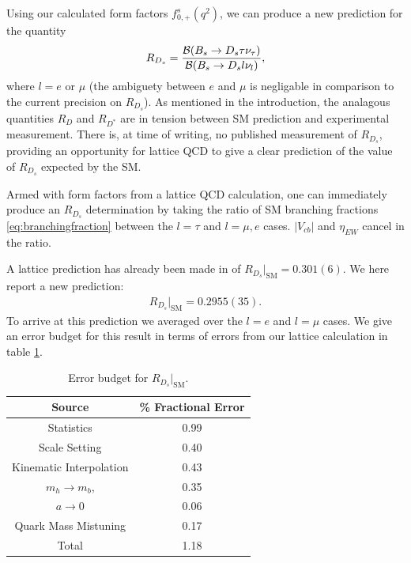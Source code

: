 Using our calculated form factors $f^s_{0,+}(q^2)$, we can produce a new prediction for the quantity
\begin{align}
  R_{D_s} = {\mathcal{B}(B_s\to D_s \tau \nu_{\tau})\over
    \mathcal{B}(B_s\to D_s l \nu_{l})},
\end{align}
where $l=e$ or $\mu$ (the ambiguety between $e$ and $\mu$ is negligable in comparison to the current precision on $R_{D_s}$). As mentioned in the introduction, the analagous quantities $R_{D}$ and $R_{D^*}$ are in tension between SM prediction and experimental measurement. There is, at time of writing, no published measurement of $R_{D_s}$, providing an opportunity for lattice QCD to give a clear prediction of the value of $R_{D_s}$ expected by the SM.

Armed with form factors from a lattice QCD calculation, one can immediately produce an $R_{D_s}$ determination by taking the ratio of SM branching fractions \eqref{eq:branchingfraction} between the $l=\tau$ and $l=\mu,e$ cases. $|V_{cb}|$ and $\eta_{EW}$ cancel in the ratio.

A lattice prediction has already been made in \cite{Monahan:2017uby} of $R_{D_s}|_{\text{SM}} = 0.301(6)$. We here report a new prediction:
\begin{align}
  R_{D_s}|_{\text{SM}} = 0.2955(35).
  \label{eq:RDs}
\end{align}
To arrive at this prediction we averaged over the $l=e$ and $l=\mu$ cases. We give an error budget for this result in terms of errors from our lattice calculation in table \ref{RDs_budget}.

\begin{table}[htb!]
  \begin{center}
    \begin{tabular}{c c}
      \hline
      Source & \% Fractional Error \\ [0.5ex]
      \hline
      Statistics & 0.99  \\ [1ex]
      Scale Setting & 0.40  \\ [1ex]
      Kinematic Interpolation & 0.43  \\ [1ex]
      $m_h \to m_b$, & 0.35  \\ [1ex]
      $a\to 0$ & 0.06  \\ [1ex]
      Quark Mass Mistuning & 0.17 \\ [1ex]
      \hline
      Total & 1.18 \\ [1ex]
      \hline
    \end{tabular}
  \end{center}
  \caption{Error budget for $R_{D_s}|_{\text{SM}}$.\label{RDs_budget}}
\end{table}

